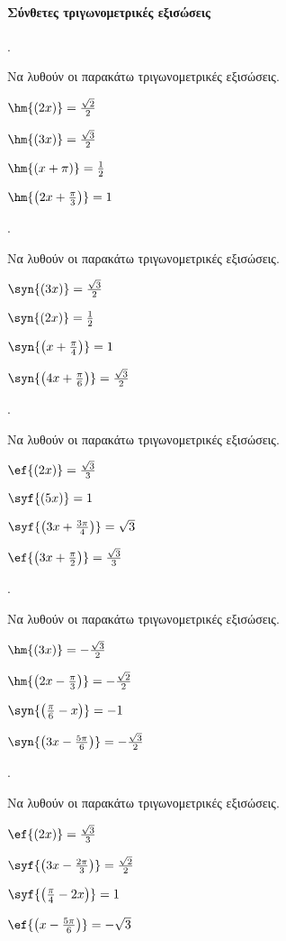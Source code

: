 \documentclass[11pt,a4paper,twocolumn]{article}
\newcounter{askhsh}
\newcommand{\askhsh}{\large\theaskhsh.\ \addtocounter{askhsh}{1}}
\begin{document}
\paragraph{Σύνθετες τριγωνομετρικές εξισώσεις}
\askhsh 
Να λυθούν οι παρακάτω τριγωνομετρικές εξισώσεις.
\begin{alist}
\begin{multicols}{2}
\item $ \hm{(2x)}=\frac{\sqrt{2}}{2} $
\item $ \hm{(3x)}=\frac{\sqrt{3}}{2} $
\item $ \hm{(x+\pi)}=\frac{1}{2} $
\item $ \hm{\left(2x+\frac{\pi}{3}\right)}=1 $
\end{multicols}
\end{alist}
\askhsh 
Να λυθούν οι παρακάτω τριγωνομετρικές εξισώσεις.
\begin{alist}
\item $ \syn{(3x)}=\frac{\sqrt{3}}{2} $
\item $ \syn{(2x)}=\frac{1}{2} $
\item $ \syn{\left( x+\frac{\pi}{4}\right) }=1 $
\item $ \syn{\left(4x+\frac{\pi}{6}\right)}=\frac{\sqrt{3}}{2} $
\end{alist}
\askhsh 
Να λυθούν οι παρακάτω τριγωνομετρικές εξισώσεις.
\begin{alist}
\item $ \ef{(2x)}=\frac{\sqrt{3}}{3} $
\item $ \syf{(5x)}=1 $
\item $ \syf{\left( 3x+\frac{3\pi}{4}\right) }=\sqrt{3} $
\item $ \ef{\left(3x+\frac{\pi}{2}\right)}=\frac{\sqrt{3}}{3} $
\end{alist}
\askhsh 
Να λυθούν οι παρακάτω τριγωνομετρικές εξισώσεις.
\begin{alist}
\item $ \hm{(3x)}=-\frac{\sqrt{3}}{2} $
\item $ \hm{\left(2x-\frac{\pi}{3}\right) }=-\frac{\sqrt{2}}{2} $
\item $ \syn{\left(\frac{\pi}{6}-x\right) }=-1 $
\item $ \syn{\left(3x-\frac{5\pi}{6}\right) }=-\frac{\sqrt{3}}{2} $
\end{alist}
\askhsh 
Να λυθούν οι παρακάτω τριγωνομετρικές εξισώσεις.
\begin{alist}
\item $ \ef{(2x)}=\frac{\sqrt{3}}{3} $
\item $ \syf{\left(3x-\frac{2\pi}{3}\right) }=\frac{\sqrt{2}}{2} $
\item $ \syf{\left(\frac{\pi}{4}-2x\right) }=1 $
\item $ \ef{\left(x-\frac{5\pi}{6}\right) }=-\sqrt{3} $
\end{alist}
\end{document}
